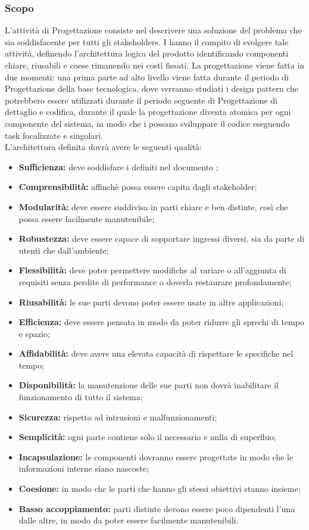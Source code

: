 \documentclass[NormeDiProgetto.tex]{subfiles}
\begin{document}
\subsubsection{Scopo}
L'attività di Progettazione consiste nel descrivere una soluzione del problema
che sia soddisfacente per tutti gli stakeholders.
I \progi hanno il compito di svolgere tale attività, definendo l'architettura logica del prodotto identificando componenti chiare, riusabili e coese rimanendo nei costi fissati. La progettazione viene fatta in due momenti: una prima parte ad alto livello viene fatta durante il periodo di Progettazione della base tecnologica, dove verranno studiati i design pattern che potrebbero essere utilizzati durante il periodo seguente di Progettazione di dettaglio e codifica, durante il quale la progettazione diventa atomica per ogni componente del sistema, in modo che i \progri possano sviluppare il codice eseguendo task focalizzate e singolari.\\
L'architettura definita dovrà avere le seguenti qualità:
\begin{itemize}
	\item \textbf{Sufficienza:} deve soddisfare i  definiti nel documento \adr;
	\item \textbf{Comprensibilità:} affinchè possa essere capita dagli stakeholder;
	\item \textbf{Modularità:} deve essere suddivisa in parti chiare e ben distinte, così che possa essere facilmente manutenibile;
	\item \textbf{Robustezza:} deve essere capace di sopportare ingressi diversi, sia da parte di utenti che dall'ambiente;
	\item \textbf{Flessibilità:} deve poter permettere modifiche al variare o all'aggiunta di requisiti senza perdite di performance o doverla restaurare profondamente;
	\item \textbf{Riusabilità:} le sue parti devono poter essere usate in altre applicazioni;
	\item \textbf{Efficienza:} deve essere pensata in modo da poter ridurre gli sprechi di tempo e spazio;
	\item \textbf{Affidabilità:} deve avere una elevata capacità di rispettare le specifiche nel tempo;
	\item \textbf{Disponibilità:} la manutenzione delle sue parti non dovrà inabilitare il funzionamento di tutto il sistema;
	\item \textbf{Sicurezza:} rispetto ad intrusioni e malfunzionamenti;
	\item \textbf{Semplicità:} ogni parte contiene solo il necessario e nulla di superfluo;
	\item \textbf{Incapsulazione:} le componenti dovranno essere progettate in modo che le informazioni interne siano nascoste;
	\item \textbf{Coesione:} in modo che le parti che hanno gli stessi obiettivi stanno insieme;
	\item \textbf{Basso accoppiamento:} parti distinte devono essere poco dipendenti l'una dalle altre, in modo da poter essere facilmente manutenibili.
\end{itemize}
\end{document}

